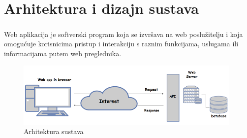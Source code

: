 \chapter{Arhitektura i dizajn sustava}
\paragraph{}{Web aplikacija je softverski program koja se izvršava na web poslužitelju i koja omogućuje korisnicima pristup i interakciju s raznim funkcijama, uslugama ili informacijama putem web preglednika.}
\begin{figure}[!htb]
	\centering
	\includegraphics[width=1\linewidth]{dijagrami/arhWeb.png}
	\caption{ Arhitektura sustava}
	\label{fig:arhsustava}
\end{figure}
